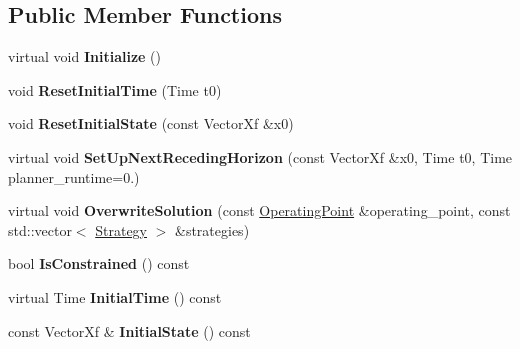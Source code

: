 \subsection*{Public Member Functions}
\begin{DoxyCompactItemize}
\item 
virtual void {\bfseries Initialize} ()\hypertarget{classilqgames_1_1_problem_ab94512f9e9896104bceada1c444a1ad9}{}\label{classilqgames_1_1_problem_ab94512f9e9896104bceada1c444a1ad9}

\item 
void {\bfseries Reset\+Initial\+Time} (Time t0)\hypertarget{classilqgames_1_1_problem_a559eb8753ba5b82afeb6c69dd722a306}{}\label{classilqgames_1_1_problem_a559eb8753ba5b82afeb6c69dd722a306}

\item 
void {\bfseries Reset\+Initial\+State} (const Vector\+Xf \&x0)\hypertarget{classilqgames_1_1_problem_ac59f8a49b028baa3d72cb065d35b8193}{}\label{classilqgames_1_1_problem_ac59f8a49b028baa3d72cb065d35b8193}

\item 
virtual void {\bfseries Set\+Up\+Next\+Receding\+Horizon} (const Vector\+Xf \&x0, Time t0, Time planner\+\_\+runtime=0.)\hypertarget{classilqgames_1_1_problem_adada206413bc775f078653da9c2ed033}{}\label{classilqgames_1_1_problem_adada206413bc775f078653da9c2ed033}

\item 
virtual void {\bfseries Overwrite\+Solution} (const \hyperlink{structilqgames_1_1_operating_point}{Operating\+Point} \&operating\+\_\+point, const std\+::vector$<$ \hyperlink{structilqgames_1_1_strategy}{Strategy} $>$ \&strategies)\hypertarget{classilqgames_1_1_problem_a14744049661872191758323a4947f072}{}\label{classilqgames_1_1_problem_a14744049661872191758323a4947f072}

\item 
bool {\bfseries Is\+Constrained} () const \hypertarget{classilqgames_1_1_problem_a4b628747d62e1871c6cc5d01e5c1f0df}{}\label{classilqgames_1_1_problem_a4b628747d62e1871c6cc5d01e5c1f0df}

\item 
virtual Time {\bfseries Initial\+Time} () const \hypertarget{classilqgames_1_1_problem_ab0eeee481eeb53317658fb9a38648f30}{}\label{classilqgames_1_1_problem_ab0eeee481eeb53317658fb9a38648f30}

\item 
const Vector\+Xf \& {\bfseries Initial\+State} () const \hypertarget{classilqgames_1_1_problem_a9b4d86b6f76908fdfc5ac82aae9320cb}{}\label{classilqgames_1_1_problem_a9b4d86b6f76908fdfc5ac82aae9320cb}


\end{DoxyCompactItemize}
